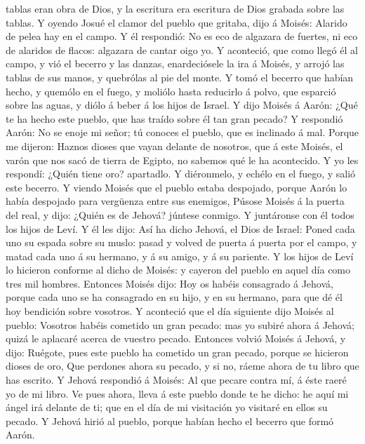 tablas eran obra de Dios, y la escritura era escritura de Dios grabada
sobre las tablas.  Y oyendo Josué el clamor del pueblo que
gritaba, dijo á Moisés: Alarido de pelea hay en el campo. 
Y él respondió: No es eco de algazara de fuertes, ni eco de alaridos de
flacos: algazara de cantar oigo yo.  Y aconteció, que como
llegó él al campo, y vió el becerro y las danzas, enardeciósele la ira á
Moisés, y arrojó las tablas de sus manos, y quebrólas al pie del monte.
 Y tomó el becerro que habían hecho, y quemólo en el fuego,
y moliólo hasta reducirlo á polvo, que esparció sobre las aguas, y diólo
á beber á los hijos de Israel.  Y dijo Moisés á Aarón: ¿Qué
te ha hecho este pueblo, que has traído sobre él tan gran pecado?
 Y respondió Aarón: No se enoje mi señor; tú conoces el
pueblo, que es inclinado á mal.  Porque me dijeron: Haznos
dioses que vayan delante de nosotros, que á este Moisés, el varón que
nos sacó de tierra de Egipto, no sabemos qué le ha acontecido.
 Y yo les respondí: ¿Quién tiene oro? apartadlo. Y
diéronmelo, y echélo en el fuego, y salió este becerro.  Y
viendo Moisés que el pueblo estaba despojado, porque Aarón lo había
despojado para vergüenza entre sus enemigos,  Púsose Moisés
á la puerta del real, y dijo: ¿Quién es de Jehová? júntese conmigo. Y
juntáronse con él todos los hijos de Leví.  Y él les dijo:
Así ha dicho Jehová, el Dios de Israel: Poned cada uno su espada sobre
su muslo: pasad y volved de puerta á puerta por el campo, y matad cada
uno á su hermano, y á su amigo, y á su pariente.  Y los
hijos de Leví lo hicieron conforme al dicho de Moisés: y cayeron del
pueblo en aquel día como tres mil hombres.  Entonces Moisés
dijo: Hoy os habéis consagrado á Jehová, porque cada uno se ha
consagrado en su hijo, y en su hermano, para que dé él hoy bendición
sobre vosotros.  Y aconteció que el día siguiente dijo
Moisés al pueblo: Vosotros habéis cometido un gran pecado: mas yo subiré
ahora á Jehová; quizá le aplacaré acerca de vuestro pecado.
 Entonces volvió Moisés á Jehová, y dijo: Ruégote, pues
este pueblo ha cometido un gran pecado, porque se hicieron dioses de
oro,  Que perdones ahora su pecado, y si no, ráeme ahora de
tu libro que has escrito.  Y Jehová respondió á Moisés: Al
que pecare contra mí, á éste raeré yo de mi libro.  Ve pues
ahora, lleva á este pueblo donde te he dicho: he aquí mi ángel irá
delante de ti; que en el día de mi visitación yo visitaré en ellos su
pecado.  Y Jehová hirió al pueblo, porque habían hecho el
becerro que formó Aarón.

